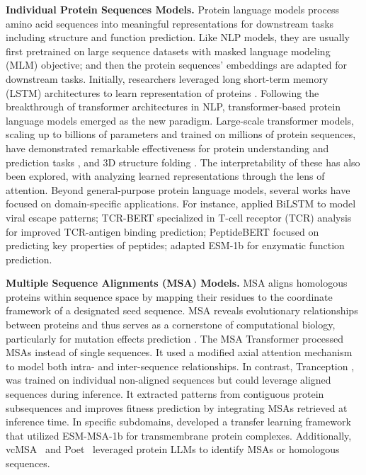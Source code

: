 \noindent \textbf{Individual Protein Sequences Models.}
Protein language models process amino acid sequences into meaningful representations for downstream tasks including structure and function prediction. Like NLP models, they are usually first pretrained on large sequence datasets with masked language modeling (MLM) objective; and then the protein sequences' embeddings are adapted for downstream tasks.
Initially, researchers leveraged long short-term memory (LSTM) architectures to learn representation of proteins \citep{alley2019unified,bepler2019learning,zhou2020mutation}. 
Following the breakthrough of transformer architectures \citep{vaswani2017attention} in NLP, transformer-based protein language models emerged as the new paradigm. Large-scale transformer models, scaling up to billions of parameters and trained on millions of protein sequences, have demonstrated remarkable effectiveness for protein understanding and prediction tasks \citep{rao2019evaluating,elnaggar2021prottrans, xiao2021modeling,hu2022exploring}, and 3D structure folding \citep{chowdhury2022single,fang2022helixfold,chen2024xtrimopglm}.
The interpretability of these \proteinllms has also been explored, with \citep{vig2020bertology} analyzing learned representations through the lens of attention.
Beyond general-purpose protein language models, several works have focused on domain-specific applications. For instance, \citet{hie2021learning} applied BiLSTM to model viral escape patterns; TCR-BERT \citep{wu2024tcr} specialized in T-cell receptor (TCR) analysis for improved TCR-antigen binding prediction; PeptideBERT \citep{guntuboina2023peptidebert} focused on predicting key properties of peptides; \citet{kroll2023turnover,yu2023enzyme} adapted ESM-1b for enzymatic function prediction.
 

\noindent \textbf{Multiple Sequence Alignments (MSA) Models.} MSA aligns homologous proteins within sequence space by mapping their residues to the coordinate framework of a designated seed sequence. MSA reveals evolutionary relationships between proteins and thus serves as a cornerstone of computational biology, particularly for mutation effects prediction \citep{ram2022few,hawkins2021msa}. The MSA Transformer \citep{rao2021msa} processed MSAs instead of single sequences. It used a modified axial attention mechanism \citep{ho2019axial,child2019generating} to model both intra- and inter-sequence relationships. In contrast, Tranception \citep{notin2022tranception}, was trained on individual non-aligned sequences but could leverage aligned sequences during inference. It extracted patterns from contiguous protein subsequences and improves fitness prediction by integrating MSAs retrieved at inference time. In specific subdomains, \citet{lin2023deep} developed a transfer learning framework that utilized ESM-MSA-1b for transmembrane protein complexes. Additionally, vcMSA~\citep{mcwhite2023leveraging} and Poet~\citep{truong2023poet} leveraged protein LLMs to identify MSAs or homologous sequences.


